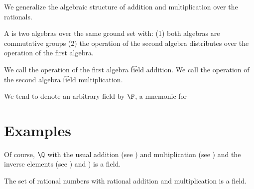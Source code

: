 

We generalize the algebraic structure of addition and multiplication over the rationals.


A  is two algebras over
the same ground set with:
(1) both algebras are commutative groups
(2) the operation of the second algebra
distributes over the operation of the first
algebra.

We call the operation of the first algebra
\t{field addition}.
We call the operation of the second algebra
\t{field multiplication}.


We tend to denote an arbitrary field by $\F$, a mnemonic for 

\section{Examples}

Of course, $\Q$ with the usual addition (see ) and multiplication (see ) and the inverse elements (see ) and ) is a field.

\begin{proposition}
  The set of rational numbers with rational addition and multiplication is a field.
\end{proposition}

\blankpage
